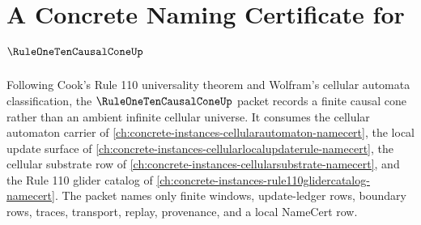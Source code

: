 \chapter{A Concrete Naming Certificate for $\RuleOneTenCausalConeUp$}
\label{ch:concrete-instances-rule-one-ten-causal-cone-namecert}

Following Cook's Rule 110 universality theorem and Wolfram's cellular automata
classification, the $\RuleOneTenCausalConeUp$ packet records a finite causal
cone rather than an ambient infinite cellular universe. It consumes the
cellular automaton carrier of
\autoref{ch:concrete-instances-cellularautomaton-namecert}, the local update
surface of \autoref{ch:concrete-instances-cellularlocalupdaterule-namecert},
the cellular substrate row of
\autoref{ch:concrete-instances-cellularsubstrate-namecert}, and the Rule 110
glider catalog of
\autoref{ch:concrete-instances-rule110glidercatalog-namecert}. The packet names
only finite windows, update-ledger rows, boundary rows, traces, transport,
replay, provenance, and a local NameCert row.


